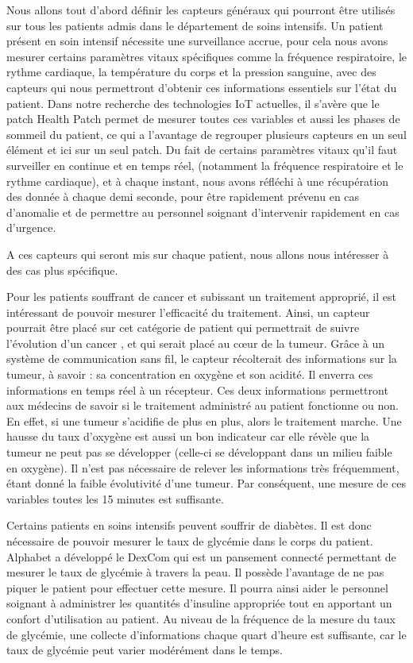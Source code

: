 \documentclass{article}
\begin{document}
Nous allons tout d’abord définir les capteurs généraux qui pourront être utilisés sur tous les patients admis dans le département de soins intensifs. Un patient présent en soin intensif nécessite une surveillance accrue, pour cela nous avons mesurer certains paramètres vitaux spécifiques comme la fréquence respiratoire, le rythme cardiaque, la température du corps et la pression sanguine, avec des capteurs qui nous permettront d’obtenir ces informations essentiels sur l’état du patient.  Dans notre recherche des technologies IoT actuelles, il s’avère que le patch Health Patch \cite{HealthPatch} permet de mesurer toutes ces variables et aussi les phases de sommeil du patient, ce qui a l’avantage de regrouper plusieurs capteurs en un seul élément  et ici sur un seul patch. Du fait de certains paramètres vitaux qu’il faut surveiller en continue et en temps réel, (notamment la fréquence respiratoire et le rythme cardiaque), et à chaque instant, nous avons réfléchi à une récupération des donnée à chaque demi seconde, pour être rapidement prévenu en cas d’anomalie et de permettre au personnel soignant d’intervenir rapidement en cas d’urgence.

A ces capteurs qui seront mis sur chaque patient, nous allons nous intéresser à des cas plus spécifique.

Pour les patients souffrant de cancer et subissant un traitement approprié, il est intéressant de pouvoir mesurer l’efficacité du traitement. Ainsi, un capteur pourrait être placé sur cet catégorie de patient qui permettrait de suivre l’évolution d’un cancer \cite{Cancer}, et qui serait placé au cœur de la tumeur. Grâce à un système de communication sans fil, le capteur récolterait des informations sur la tumeur, à savoir : sa concentration en oxygène et son acidité. Il enverra ces informations en temps réel à un récepteur. Ces deux informations permettront aux médecins de savoir si le traitement administré au patient fonctionne ou non. En effet, si une tumeur s’acidifie de plus en plus, alors le traitement marche. Une hausse du taux d’oxygène est aussi un bon indicateur car elle révèle que la tumeur ne peut pas se développer (celle-ci se développant dans un milieu faible en oxygène). Il n’est pas nécessaire de relever les informations très fréquemment, étant donné la faible évolutivité d’une tumeur. Par conséquent, une mesure de ces variables toutes les 15 minutes est suffisante.

Certains patients en soins intensifs peuvent souffrir de diabètes. Il est donc nécessaire de pouvoir mesurer le taux de glycémie dans le corps du patient. Alphabet a développé le DexCom \cite{Diabete} qui  est un pansement connecté permettant de mesurer le taux de glycémie à travers la peau. Il possède l’avantage de ne pas piquer le patient pour effectuer cette mesure. Il pourra ainsi aider le personnel soignant à administrer les quantités d’insuline appropriée tout en apportant un confort d’utilisation au patient.  Au niveau de la fréquence de la mesure du taux de glycémie, une collecte d’informations chaque quart d'heure est suffisante, car le taux de glycémie peut varier modérément dans le temps.
\end{document}
